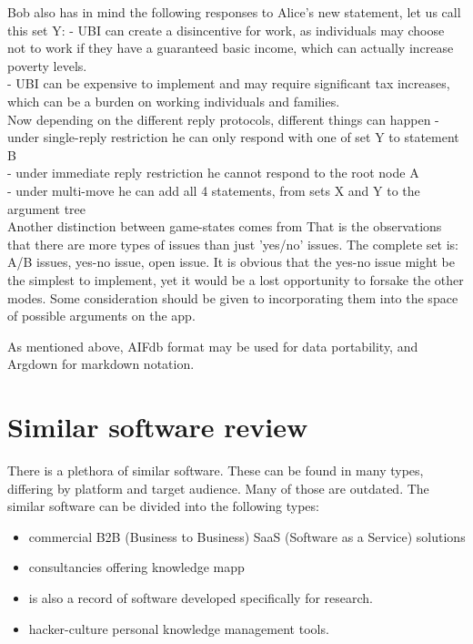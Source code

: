 \documentclass{report}
\begin{document}
Bob also has in mind the following responses to Alice's new statement, let us call this set Y:
- UBI can create a disincentive for work, as individuals may choose not to work if they have a guaranteed basic income, which can actually increase poverty levels. \\
- UBI can be expensive to implement and may require significant tax increases, which can be a burden on working individuals and families. \\

Now depending on the different reply protocols, different things can happen
- under single-reply restriction he can only respond with one of set Y to statement B \\
- under immediate reply restriction he cannot respond to the root node A \\
- under multi-move he can add all 4 statements, from sets X and Y to the argument tree \\

Another distinction between game-states comes from \cite{wyner_argument_2015}
That is the observations that there are more types of issues than just 'yes/no' issues.
The complete set is: A/B issues, yes-no issue, open issue.
It is obvious that the yes-no issue might be the simplest to implement, yet it would be a lost opportunity to forsake the other modes.
Some consideration should be given to incorporating them into the space of possible arguments on the app.

As mentioned above, AIFdb format may be used for data portability, and Argdown for markdown notation.

\section{Similar software review}
There is a plethora of similar software. These can be found in many types, differing by platform and target audience. Many of those are outdated.
The similar software can be divided into the following types:
\begin{itemize}
  \item  commercial B2B (Business to Business) SaaS (Software as a Service) solutions 
  \item  consultancies offering knowledge mapp
  \item  is also a record of software developed specifically for research.
  \item  hacker-culture personal knowledge management tools.
\end{itemize}
\end{document}
